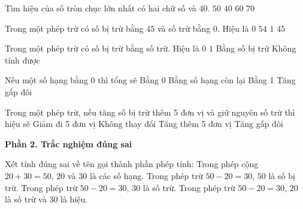 \begin{ex} %
Tìm hiệu của số tròn chục lớn nhất có hai chữ số và $40$.
\choice
{\True $50$}
{$40$}
{$60$}
{$70$}
\end{ex}

\begin{ex} %
Trong một phép trừ có số bị trừ bằng $45$ và số trừ bằng $0$. Hiệu là
\choice
{$0$}
{$54$}
{$1$}
{\True $45$}
\end{ex}

\begin{ex} %
Trong một phép trừ có số bị trừ bằng số trừ. Hiệu là
\choice
{\True $0$}
{$1$}
{Bằng số bị trừ}
{Không tính được}
\end{ex}

\begin{ex} %
Nếu một số hạng bằng 0 thì tổng sẽ
\choice
{Bằng 0}
{\True Bằng số hạng còn lại}
{Bằng 1}
{Tăng gấp đôi}
\end{ex}

\begin{ex} %
Trong một phép trừ, nếu tăng số bị trừ thêm 5 đơn vị và giữ nguyên số trừ thì hiệu sẽ
\choice
{Giảm đi 5 đơn vị}
{Không thay đổi}
{\True Tăng thêm 5 đơn vị}
{Tăng gấp đôi}
\end{ex}

\textbf{Phần 2. Trắc nghiệm đúng sai}

\begin{ex} %
Xét tính đúng sai về tên gọi thành phần phép tính:
\choiceTF
{\True Trong phép cộng $20 + 30 = 50$, $20$ và $30$ là các số hạng.}
{\True Trong phép trừ $50 - 20 = 30$, $50$ là số bị trừ.}
{Trong phép trừ $50 - 20 = 30$, $30$ là số trừ.}
{\True Trong phép trừ $50 - 20 = 30$, $20$ là số trừ và $30$ là hiệu.}
\end{ex}

